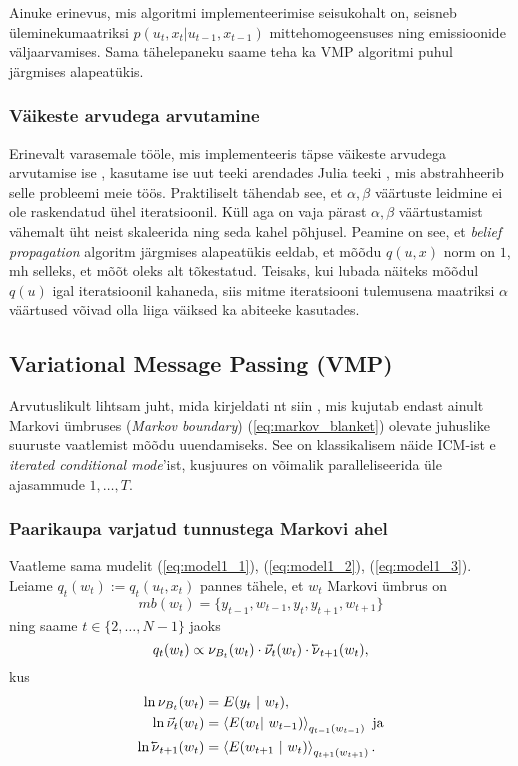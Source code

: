 Ainuke erinevus, mis algoritmi implementeerimise seisukohalt on, seisneb üleminekumaatriksi $p(u_t,x_t|u_{t-1},x_{t-1})$ mittehomogeensuses ning emissioonide väljaarvamises. Sama tähelepaneku saame teha ka VMP algoritmi puhul järgmises alapeatükis.

\subsubsection{Väikeste arvudega arvutamine}

Erinevalt varasemale tööle, mis implementeeris täpse väikeste arvudega arvutamise ise \parencite{Soop.2023}, kasutame ise uut teeki \parencite{Pihel.2024} arendades Julia teeki \parencite{Rowley.2024}, mis abstrahheerib selle probleemi meie töös. Praktiliselt tähendab see, et $\alpha, \beta$ väärtuste leidmine ei ole raskendatud ühel iteratsioonil. Küll aga on vaja pärast $\alpha, \beta$ väärtustamist vähemalt üht neist skaleerida ning seda kahel põhjusel. Peamine on see, et \emph{belief propagation} algoritm järgmises alapeatükis eeldab, et mõõdu $q(u,x)$ norm on $1$, mh selleks, et mõõt oleks alt tõkestatud. Teisaks, kui lubada näiteks mõõdul $q(u)$ igal iteratsioonil kahaneda, siis mitme iteratsiooni tulemusena maatriksi $\alpha$ väärtused võivad olla liiga väiksed ka abiteeke kasutades.

\subsection{Variational Message Passing (VMP)}

Arvutuslikult lihtsam juht, mida kirjeldati nt siin \parencite{Parr.2019}, mis kujutab endast ainult Markovi ümbruses (\textit{Markov boundary}) (\ref{eq:markov_blanket}) olevate juhuslike suuruste vaatlemist mõõdu uuendamiseks.
See on klassikalisem näide ICM-ist e \emph{iterated conditional mode}'ist, kusjuures on võimalik paralleliseerida üle ajasammude $1, \ldots, T$.

\subsubsection{Paarikaupa varjatud tunnustega Markovi ahel}

Vaatleme sama mudelit (\ref{eq:model1_1}), (\ref{eq:model1_2}), (\ref{eq:model1_3}). Leiame $q_t(w_t) := q_t(u_t,x_t)$ pannes tähele, et $w_t$ Markovi ümbrus on
$$mb(w_t) = \{y_{t-1},w_{t-1},y_t,y_{t+1},w_{t+1} \}$$
ning saame $t \in \{2,\ldots,N-1\}$ jaoks
$$q_t(w_t) \propto \nu_{B_t}(w_t) \cdot \vec{\nu}_{t}(w_t) \cdot \cev{\nu}_{t+1}(w_t),
$$
kus
\begin{align*}
    \ln \nu_{B_t}(w_t) &= E(y_t\ |\ w_t),\\
    \ln \vec{\nu}_{t}(w_t) &= \left< E(w_t |\ w_{t-1}) \right>_{q_{t-1}(w_{t-1})} \text{ ja}\\
    \ln \cev{\nu}_{t+1}(w_t) &= \left< E(w_{t+1}\ |\ w_t) \right>_{q_{t+1}(w_{t+1})}.
\end{align*}

